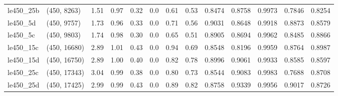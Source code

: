 \begin{tabular}{llrrrrrrrrrrr}
 le450\_25b &  (450, 8263) &  1.51 & 0.97 & 0.32 &  0.0 &  0.61 &   0.53 &   0.8474 &   0.8758 &    0.9973 &     0.7846 &      0.8254 \\
  le450\_5d &  (450, 9757) &  1.73 & 0.96 & 0.33 &  0.0 &  0.71 &   0.56 &   0.9031 &   0.8648 &    0.9918 &     0.8873 &      0.8579 \\
  le450\_5c &  (450, 9803) &  1.74 & 0.98 & 0.30 &  0.0 &  0.65 &   0.51 &   0.8905 &   0.8694 &    0.9962 &     0.8485 &      0.8866 \\
 le450\_15c & (450, 16680) &  2.89 & 1.01 & 0.43 &  0.0 &  0.94 &   0.69 &   0.8548 &   0.8196 &    0.9959 &     0.8764 &      0.8987 \\
 le450\_15d & (450, 16750) &  2.89 & 1.00 & 0.40 &  0.0 &  0.82 &   0.78 &   0.8996 &   0.9061 &    0.9933 &     0.8585 &      0.8597 \\
 le450\_25c & (450, 17343) &  3.04 & 0.99 & 0.38 &  0.0 &  0.80 &   0.73 &   0.8544 &   0.9083 &    0.9983 &     0.7688 &      0.8708 \\
 le450\_25d & (450, 17425) &  2.99 & 0.99 & 0.43 &  0.0 &  0.89 &   0.82 &   0.8758 &   0.9339 &    0.9956 &     0.9017 &      0.8726 \\
\bottomrule
\end{tabular}
